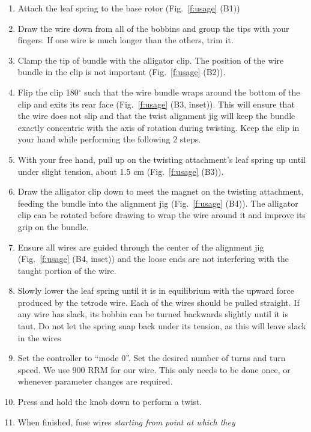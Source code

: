 \documentclass[11pt,a4paper]{article}
\begin{document}
\begin{enumerate}[noitemsep]
    \item Attach the leaf spring to the base rotor (Fig.~\ref{f:usage} (B1))
    \item Draw the wire down from all of the bobbins and group the tips with
        your fingers. If one wire is much longer than the others, trim it.
    \item Clamp the tip of bundle with the alligator clip. The position of the
        wire bundle in the clip is not important (Fig.~\ref{f:usage} (B2)).
    \item Flip the clip 180$^{\circ}$ such that the wire bundle wraps around the
        bottom of the clip and exits its rear face (Fig.~\ref{f:usage} (B3,
        inset)). This will ensure that the wire does not slip and that the
        twist alignment jig will keep the bundle exactly concentric with the
        axis of rotation during twisting.  Keep the clip in your hand while
        performing the following 2 steps.
    \item With your free hand, pull up on the twisting attachment's leaf spring
        up until under slight tension, about 1.5 cm (Fig.~\ref{f:usage} (B3)).
    \item Draw the alligator clip down to meet the magnet on the twisting
        attachment, feeding the bundle into the alignment jig
        (Fig.~\ref{f:usage} (B4)). The alligator clip can be rotated before
        drawing to wrap the wire around it and improve its grip on the bundle.
    \item Ensure all wires are guided through the center of the alignment jig
        (Fig.~\ref{f:usage} (B4, inset)) and the loose ends are not interfering
        with the taught portion of the wire.
    \item Slowly lower the leaf spring until it is in equilibrium with the
        upward force produced by the tetrode wire. Each of the wires should be
        pulled straight. If any wire has slack, its bobbin can be turned
        backwards slightly until it is taut. Do not let the spring snap back
        under its tension, as this will leave slack in the wires
    \item Set the controller to ``mode 0''. Set the desired number of turns and
        turn speed. We use 900 RRM for our wire. This only needs to be done
        once, or whenever parameter changes are required.
    \item Press and hold the knob down to perform a twist.
    \item When finished, fuse wires \textit{starting from point at which they
}
\end{enumerate}
\end{document}
